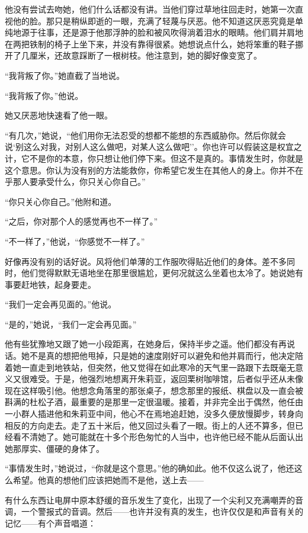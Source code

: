 他没有尝试去吻她，他们什么话都没有讲。当他们穿过草地往回走时，她第一次直视他的脸。那只是稍纵即逝的一眼，充满了轻蔑与厌恶。他不知道这厌恶究竟是单纯地源于往事，还是源于他那浮肿的脸和被风吹得淌着泪水的眼睛。他们肩并肩地在两把铁制的椅子上坐下来，并没有靠得很紧。她想说点什么，她将笨重的鞋子挪开了几厘米，还故意踩断了一根树枝。他注意到，她的脚好像变宽了。

``我背叛了你。''她直截了当地说。

``我背叛了你。''他说。

她又厌恶地快速看了他一眼。

``有几次，''她说，``他们用你无法忍受的想都不能想的东西威胁你。然后你就会说`别这么对我，对别人这么做吧，对某人这么做吧''。你也许可以假装这是权宜之计，它不是你的本意，你只想让他们停下来。但这不是真的。事情发生时，你就是这个意思。你认为没有别的方法能救你，你希望它发生在其他人的身上。你并不在乎那人要承受什么，你只关心你自己。''

``你只关心你自己。''他附和道。

``之后，你对那个人的感觉再也不一样了。''

``不一样了，''他说，``你感觉不一样了。''

好像再没有别的话好说。风将他们单薄的工作服吹得贴近他们的身体。差不多同时，他们觉得默默无语地坐在那里很尴尬，更何况就这么坐着也太冷了。她说她有事要赶地铁，起身要走。

``我们一定会再见面的。''他说。

``是的，''她说，``我们一定会再见面。''

他有些犹豫地又跟了她一小段距离，在她身后，保持半步之遥。他们都没有再说话。她不是真的想把他甩掉，只是她的速度刚好可以避免和他并肩而行，他决定陪着她一直走到地铁站，但突然，他又觉得在如此寒冷的天气里一路跟下去既毫无意义又很难受。于是，他强烈地想离开朱莉亚，返回栗树咖啡馆，后者似乎还从未像现在这样吸引他。他想念角落里的那张桌子，想念那里的报纸、棋盘以及一直会被斟满的杜松子酒，最重要的是那里一定很温暖。接着，并非完全出于偶然，他任由一小群人插进他和朱莉亚中间，他心不在焉地追赶她，没多久便放慢脚步，转身向相反的方向走去。走了五十米后，他又回过头看了一眼。街上的人还不算多，但已经看不清她了。她可能就在十多个形色匆忙的人当中，也许他已经不能从后面认出她那厚实、僵硬的身体了。

``事情发生时，''她说过，``你就是这个意思。''他的确如此。他不仅这么说了，他还这么希望。他真的想他们应该把她而不是他，送上去——

有什么东西让电屏中原本舒缓的音乐发生了变化，出现了一个尖利又充满嘲弄的音调，一个警报式的音调。然后——也许并没有真的发生，也许仅仅是和声音有关的记忆——有个声音唱道：

